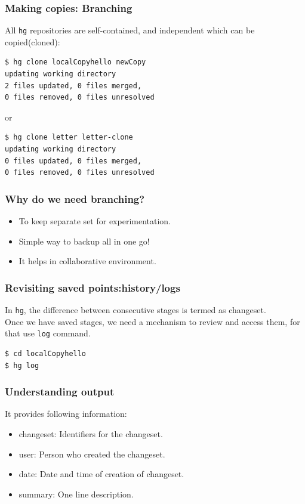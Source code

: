 \documentclass[14pt,compress]{beamer}
\newcounter{time}
\newcommand{\inctime}[1]{\addtocounter{time}{#1}{\tiny \thetime\ m}}
\newcommand{\typ}[1]{\lstinline{#1}}
\begin{document}
\begin{frame}[fragile]
  \frametitle{Making copies: Branching}
  All \typ{hg} repositories are self-contained, and independent which can be copied(cloned):
  \begin{lstlisting}
$ hg clone localCopyhello newCopy
updating working directory
2 files updated, 0 files merged, 
0 files removed, 0 files unresolved
  \end{lstlisting}
  \alert{or}
  \begin{lstlisting}
$ hg clone letter letter-clone
updating working directory
0 files updated, 0 files merged, 
0 files removed, 0 files unresolved 
 \end{lstlisting}
\end{frame}

\begin{frame}[fragile]
  \frametitle{Why do we need branching?}
  \begin{block}{}
    \begin{itemize}
    \item To keep separate set for \alert{experimentation}.
    \item Simple way to \alert{backup} all in one go!
    \item It helps in collaborative environment.
    \end{itemize}
  \end{block}
  \inctime{15}
\end{frame}

\begin{frame}[fragile]
  \frametitle{Revisiting saved points:history/logs}
  In \typ{hg}, the difference between consecutive stages is termed as \alert{changeset}.\\
  Once we have saved stages, we need a mechanism to review and access them, for that use \alert{\typ{log}} command.
  \begin{lstlisting}
$ cd localCopyhello
$ hg log    
  \end{lstlisting}
\end{frame}

\begin{frame}[fragile]
  \frametitle{Understanding output}
  It provides following information:
  \begin{itemize}
  \item \alert{changeset}: Identifiers for the changeset.
  \item \alert{user}: Person who created the changeset.
  \item \alert{date}: Date and time of creation of changeset.
  \item \alert{summary}: One line description.
  \end{itemize}
\end{frame}
\end{document}
